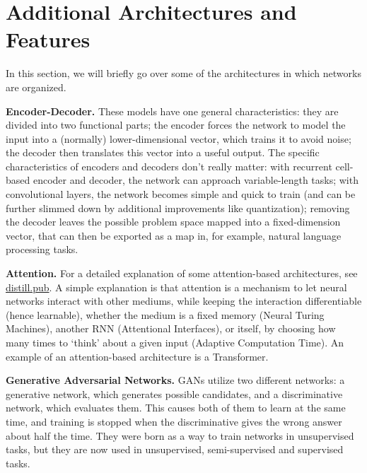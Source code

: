 \documentclass[../main.tex]{subfiles}
\begin{document}
\section{Additional Architectures and Features}
In this section, we will briefly go over some of the architectures in which networks are organized.

\textbf{Encoder-Decoder.} These models have one general characteristics: they are divided into two functional parts; the encoder forces the network to model the input into a (normally) lower-dimensional vector, which trains it to avoid noise; the decoder then translates this vector into a useful output. The specific characteristics of encoders and decoders don't really matter: with recurrent cell-based encoder and decoder, the network can approach variable-length tasks; with convolutional layers, the network becomes simple and quick to train (and can be further slimmed down by additional improvements like quantization); removing the decoder leaves the possible problem space mapped into a fixed-dimension vector, that can then be exported as a map in, for example, natural language processing tasks.

\textbf{Attention.} For a detailed explanation of some attention-based architectures, see \href{https://distill.pub/2016/augmented-rnns/}{distill.pub}. A simple explanation is that attention is a mechanism to let neural networks interact with other mediums, while keeping the interaction differentiable (hence learnable), whether the medium is a fixed memory (Neural Turing Machines), another RNN (Attentional Interfaces), or itself, by choosing how many times to `think' about a given input (Adaptive Computation Time). An example of an attention-based architecture is a Transformer.

\textbf{Generative Adversarial Networks.} GANs utilize two different networks: a generative network, which generates possible candidates, and a discriminative network, which evaluates them. This causes both of them to learn at the same time, and training is stopped when the discriminative gives the wrong answer about half the time. They were born as a way to train networks in unsupervised tasks, but they are now used in unsupervised, semi-supervised and supervised tasks.
\end{document}
